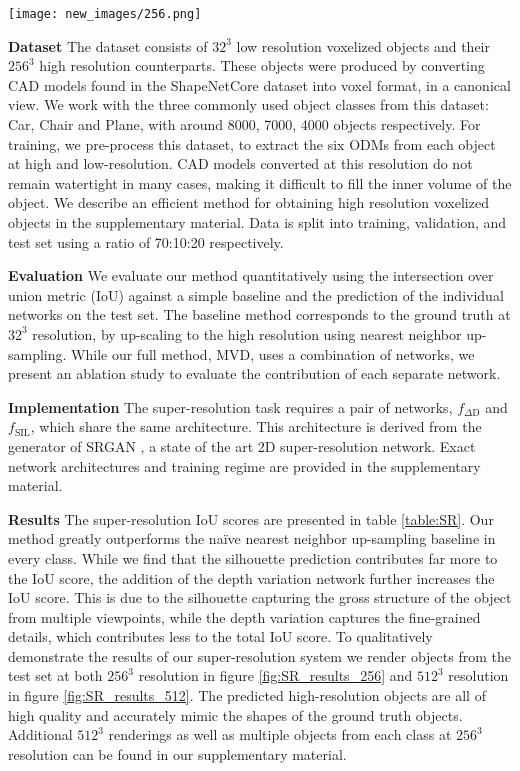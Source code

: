 \documentclass{article}
\begin{document}
\begin{figure*} 
\texttt{[image: new\_images/256.png]}
\centering
\caption{Super-resolution rendering results. Each pair shows the low resolution input (left) and the results of MVD at $256^3$ resolution (right).} \label{fig:SR_results_256}
\end{figure*}


\textbf{Dataset} \quad The dataset consists of $32^3$ low resolution voxelized objects and their $256^3$ high resolution counterparts. These objects were produced by converting CAD models found in the ShapeNetCore dataset \cite{ShapeNet} into voxel format, in a canonical view. We work with the three commonly used object classes from this dataset: Car, Chair and Plane, with around 8000, 7000, 4000 objects respectively. For training, we pre-process this dataset, to extract the six ODMs from each object at high and low-resolution. CAD models converted at this resolution do not remain watertight in many cases, making it difficult to fill the inner volume of the object. We describe an efficient method for obtaining high resolution voxelized objects in the supplementary material. Data is split into training, validation, and test set using a ratio of 70:10:20 respectively.


\textbf{Evaluation} \quad We evaluate our method quantitatively using the intersection over union metric (IoU) against a simple baseline and the prediction of the individual networks on the test set. The baseline method corresponds to the ground truth at $32^3$ resolution, by up-scaling to the high resolution using nearest neighbor up-sampling. While our full method, MVD, uses a combination of networks, we present an ablation study to evaluate the contribution of each separate network. 


\textbf{Implementation} \quad The super-resolution task requires a pair of networks, $f_{\Delta \text{D}}$ and $f_{\text{SIL}}$, which share the same architecture. This architecture is derived from the generator of SRGAN \cite{SRGAN}, a state of the art 2D super-resolution network. Exact network architectures and training regime are provided in the supplementary material. 

\textbf{Results} \quad The super-resolution IoU scores are presented in table \ref{table:SR}. Our method greatly outperforms the na{\"i}ve nearest neighbor up-sampling baseline in every class. While we find that the silhouette prediction contributes far more to the IoU score, the addition of the depth variation network further increases the IoU score. This is due to the silhouette capturing the gross structure of the object from multiple viewpoints, while the depth variation captures the fine-grained details, which contributes less to the total IoU score. To qualitatively demonstrate the results of our super-resolution system we render objects from the test set at both $256^3$ resolution in figure \ref{fig:SR_results_256} and $512^3$ resolution in figure \ref{fig:SR_results_512}. The predicted high-resolution objects are all of high quality and accurately mimic the shapes of the ground truth objects. Additional $512^3$ renderings as well as multiple objects from each class at $256^3$ resolution can be found in our supplementary material.
\end{document}
